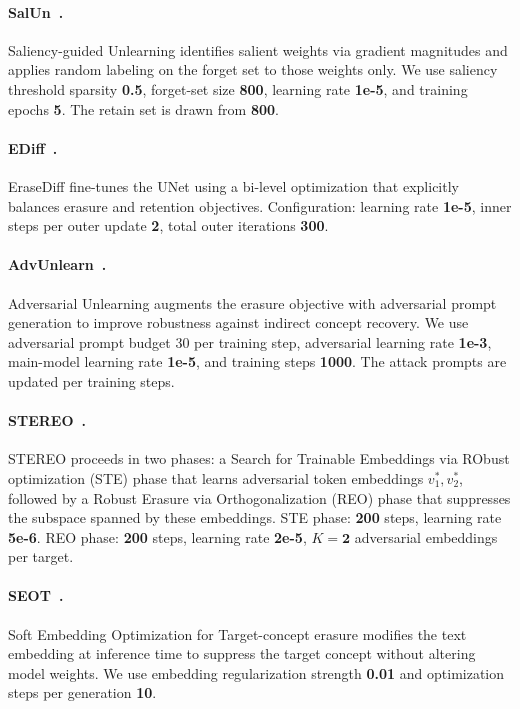 \paragraph{SalUn~\citep{fan2023salun}.} 
Saliency-guided Unlearning identifies salient weights via gradient magnitudes and applies random labeling on the forget set to those weights only. We use saliency threshold sparsity \textbf{0.5}, forget-set size \textbf{800}, learning rate \textbf{1e-5}, and training epochs \textbf{5}. The retain set is drawn from \textbf{800}.
\paragraph{EDiff~\citep{wu2024erasediff}.} 
EraseDiff fine-tunes the UNet using a bi-level optimization that explicitly balances erasure and retention objectives. Configuration: learning rate \textbf{1e-5}, inner steps per outer update \textbf{2}, total outer iterations \textbf{300}.
\paragraph{AdvUnlearn~\citep{zhang2024defensive}.} 
Adversarial Unlearning augments the erasure objective with adversarial prompt generation to improve robustness against indirect concept recovery. We use adversarial prompt budget 30 per training step, adversarial learning rate \textbf{1e-3}, main-model learning rate \textbf{1e-5}, and training steps \textbf{1000}. The attack prompts are updated per training steps.
\paragraph{STEREO~\citep{srivatsan2025stereo}.} 
STEREO proceeds in two phases: a Search for Trainable Embeddings via RObust optimization (STE) phase that learns adversarial token embeddings $v_1^*, v_2^*$, followed by a Robust Erasure via Orthogonalization (REO) phase that suppresses the subspace spanned by these embeddings. STE phase: \textbf{200} steps, learning rate 
\textbf{5e-6}. REO phase: \textbf{200} steps, learning rate \textbf{2e-5}, $K = \textbf{2}$ adversarial embeddings per target.
\paragraph{SEOT~\citep{li2024get}.} 
Soft Embedding Optimization for Target-concept erasure modifies the text embedding at inference time to suppress the target concept without altering model weights. We use embedding regularization strength \textbf{0.01} and optimization steps per generation \textbf{10}.
